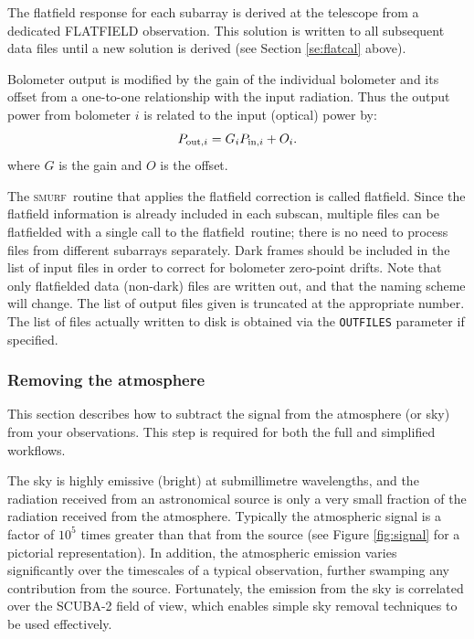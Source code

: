 \documentclass[twoside,11pt]{article}
\newcommand{\xref}[3]{#1}
\newcommand{\xlabel}[1]{}
\renewcommand{\_}{\texttt{\symbol{95}}}
\newcommand{\SMURF}{\textsc{smurf}}
\newcommand{\task}[1]{\textsf{#1}}
\newcommand{\flatfield}{\xref{\task{flatfield}}{sun258}{FLATFIELD}}
\newcommand{\aparam}[1]{\texttt{#1}}     %
\begin{document}
The flatfield response for each subarray is derived at the telescope
from a dedicated FLATFIELD observation. This solution is written to
all subsequent data files until a new solution is derived (see Section
\ref{se:flatcal} above).

Bolometer output is modified by the gain of the individual bolometer
and its offset from a one-to-one relationship with the input
radiation. Thus the output power from bolometer $i$ is related to the
input (optical) power by:
\begin{equation}
P_{{\rm out},i} = G_i P_{{\rm in},i} + O_i.
\end{equation}
where $G$ is the gain and $O$ is the offset.

The \SMURF\ routine that applies the flatfield correction is called
\flatfield. Since the flatfield information is already included in
each subscan, multiple files can be flatfielded with a single call to
the \flatfield\ routine; there is no need to process files from
different subarrays separately. Dark frames should be included in the
list of input files in order to correct for bolometer zero-point
drifts. Note that only flatfielded data (non-dark) files are written
out, and that the naming scheme will change. The list of output files
given is truncated at the appropriate number. The list of files
actually written to disk is obtained via the \aparam{OUTFILES}
parameter if specified.

\subsubsection{\xlabel{skysub}Removing the atmosphere\label{se:skysub}}

This section describes how to subtract the signal from the atmosphere
(or sky) from your observations. This step is required for both the
full and simplified workflows.

The sky is highly emissive (bright) at submillimetre
wavelengths\cite{archibald}, and the radiation received from an
astronomical source is only a very small fraction of the radiation
received from the atmosphere. Typically the atmospheric signal is a
factor of $10^5$ times greater than that from the source (see Figure
\ref{fig:signal} for a pictorial representation). In addition, the
atmospheric emission varies significantly over the timescales of a
typical observation, further swamping any contribution from the
source. Fortunately, the emission from the sky is correlated over the
SCUBA-2 field of view, which enables simple sky removal techniques to
be used effectively\cite{archibald,sc2ana002}.
\end{document}
